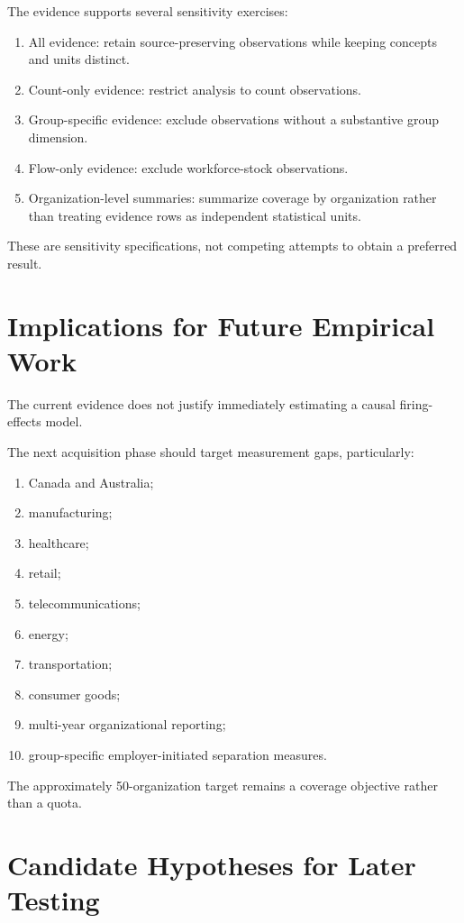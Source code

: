 \documentclass[a4paper,10pt]{article}
\begin{document}
The evidence supports several sensitivity exercises:
\begin{enumerate}
\item All evidence: retain source-preserving observations while keeping concepts and units distinct.
\item Count-only evidence: restrict analysis to count observations.
\item Group-specific evidence: exclude observations without a substantive group dimension.
\item Flow-only evidence: exclude workforce-stock observations.
\item Organization-level summaries: summarize coverage by organization rather than treating evidence rows as independent statistical units.
\end{enumerate}

These are sensitivity specifications, not competing attempts to obtain a preferred result.

\section{Implications for Future Empirical Work}

The current evidence does not justify immediately estimating a causal firing-effects model.

The next acquisition phase should target measurement gaps, particularly:
\begin{enumerate}
\item Canada and Australia;
\item manufacturing;
\item healthcare;
\item retail;
\item telecommunications;
\item energy;
\item transportation;
\item consumer goods;
\item multi-year organizational reporting;
\item group-specific employer-initiated separation measures.
\end{enumerate}

The approximately 50-organization target remains a coverage objective rather than a quota.

\section{Candidate Hypotheses for Later Testing}
\end{document}
